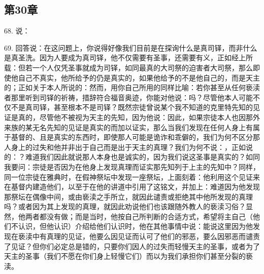 
\subsection{第30章}

68. 说：\par

69. 回答说：在这问题上，你说得好像我们目前是在探询什么是真司铎，而非什么是真圣洗。因为人要成为真司铎，他不仅需要有圣事，还需要有义，正如经上所载：但若一个人仅凭圣事就成为司铎，如同最真的大司祭的迫害者大司祭，那么即使他自己不真实，他所给予的仍是真实的，如果他给予的不是他自己的，而是天主的；正如关于本人所说的：然而，用你自己所用的同样比喻：若你甚至从任何亵渎者那里听到司铎的祈祷，措辞符合福音奥迹，你能对他说：吗？尽管他本人可能不仅不是真司铎，甚至根本不是司铎？既然宗徒曾说某个我不知道的克里特先知的见证是真的，尽管他不被视为天主的先知，因为他说：因此，如果宗徒本人也因那外来族的某无名先知的见证是真实的而加以证实，那么当我们发现在任何人身上有属于基督的、且是真实的东西时，即使那人可能是诡诈和乖僻的，我们为何不区分那人身上的过失和他并非出于自己而是出于天主的真理？我们为何不说：，正如说的：？难道我们因此就说那人本身也是诚实的，因为我们说这圣事是真实的？如同我要问：宗徒是否因为在他身上发现真理而证实那先知列于上主的先知中？同样，同一位宗徒在雅典时，在假神祭坛中发现一座祭坛，上面刻着：他利用这个见证来在基督内建造他们，以至于在他的讲道中引用了这铭文，并加上：难道因为他发现那祭坛在偶像中间，或由亵渎之手所立，就因此谴责或拒绝其中他所发现的真理吗？或者因为其上发现的真理，就因此劝说他们也该跟随外教人的亵渎习俗？显然，他两者都没有做；而是当时，他按自己所判断的合适方式，希望将主自己（他们不认识，但他认识）介绍给他们认识时，他在其他事情中说：能说这里因为他发现在亵渎中有真理的见证，他要么因见证而认可了他们的邪恶，要么因邪恶而谴责了见证？但你们必定总是错的，只要你们因人的过失而轻慢天主的圣事，或者为了天主的圣事（我们不愿在你们身上轻慢它们）而以为我们承担你们甚至分裂的亵渎。\par

